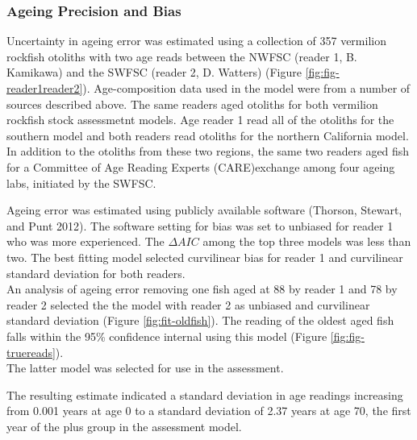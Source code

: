 \documentclass[11pt,
  english,
  a4paper,
]{article}
\begin{document}

\hypertarget{ageing-precision-and-bias}{%
\subsubsection{Ageing Precision and Bias}\label{ageing-precision-and-bias}}

\leavevmode\tagmcend\tagstructend

Uncertainty in ageing error was estimated using a collection of 357 vermilion rockfish otoliths with two age reads between the NWFSC (reader 1, B. Kamikawa) and the SWFSC (reader 2, D. Watters) (Figure \ref{fig:fig-reader1reader2}). Age-composition data used in the model were from a number of sources described above. The same readers aged otoliths for both vermilion rockfish stock assessmetnt models. Age reader 1 read all of the otoliths for the southern model and both readers read otoliths for the northern California model. In addition to the otoliths from these two regions, the same two readers aged fish for a Committee of Age Reading Experts (CARE)exchange among four ageing labs, initiated by the SWFSC.

Ageing error was estimated using publicly available software {(Thorson, Stewart, and Punt 2012)\leavevmode\tagmcend\tagstructend}. The software setting for bias was set to unbiased for reader 1 who was more experienced. The {\(\Delta AIC\)\leavevmode\tagmcend\tagstructend} among the top three models was less than two. The best fitting model selected curvilinear bias for reader 1 and curvilinear standard deviation for both readers.\\
An analysis of ageing error removing one fish aged at 88 by reader 1 and 78 by reader 2 selected the the model with reader 2 as unbiased and curvilinear standard deviation (Figure \ref{fig:fit-oldfish}). The reading of the oldest aged fish falls within the 95\% confidence internal using this model (Figure \ref{fig:fig-truereads}).\\
The latter model was selected for use in the assessment.

The resulting estimate indicated a standard deviation in age readings increasing from 0.001 years at age 0 to a standard deviation of 2.37 years at age 70, the first year of the plus group in the assessment model.

\end{document}

